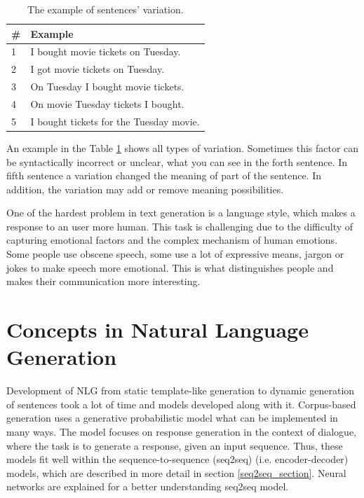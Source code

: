 \begin{table}[ht]
\centering
 \begin{tabular}{|p{0.5cm}|p{8cm}|} 
 \hline
 \textbf{\#} & \textbf{Example} \\
 \hline
 1 & I bought movie tickets on Tuesday. \\ 
 \hline
 2 & I got movie tickets on Tuesday. \\
 \hline
 3 & On Tuesday I bought movie tickets. \\
 \hline
 4 & On movie Tuesday tickets I bought. \\
 \hline
 5 & I bought tickets for the Tuesday movie. \\ 
 \hline
 \end{tabular}
 \caption{The example of sentences' variation.}
\label{tab:var_example}
\end{table}

An example in the Table \ref{tab:var_example} shows all types of variation. Sometimes this factor can be syntactically incorrect or unclear, what you can see in the forth sentence. In fifth sentence a variation changed the meaning of part of the sentence. In addition, the variation may add or remove meaning possibilities.


One of the hardest problem in text generation is a language style, which makes a response to an user more human. This task is challenging due to the difficulty of capturing emotional factors and the complex mechanism of human emotions. Some people use obscene speech, some use a lot of expressive means, jargon or jokes to make speech more emotional. This is what distinguishes people and makes their communication more interesting.

\chapter{Concepts in Natural Language Generation} \label{nlg_models}
Development of NLG from static template-like generation to dynamic generation of sentences took a lot of time and models developed along with it. Corpus-based generation uses a generative probabilistic model what can be implemented in many ways. The model focuses on response generation in the context of dialogue, where the task is to generate a response, given an input sequence. Thus, these models fit well within the sequence-to-sequence (seq2seq) (i.e. encoder-decoder) models, which are described in more detail in section \ref{seq2seq_section}. Neural networks are explained for a better understanding seq2seq model.


